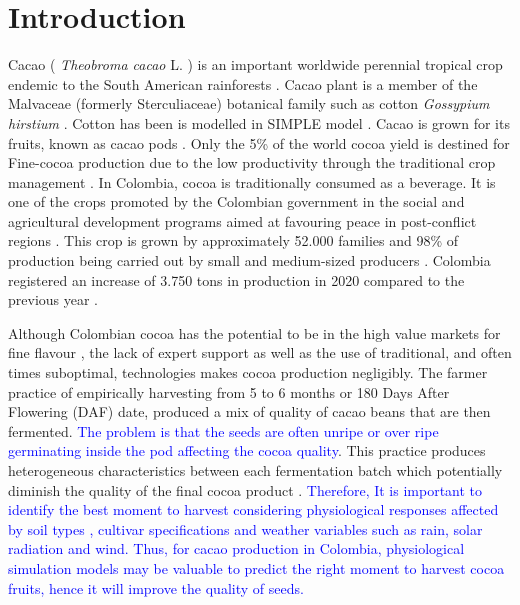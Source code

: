 \documentclass[gene,journal,article,submit,moreauthors,pdftex]{Definitions/mdpi}
\begin{document}

\section{Introduction}

Cacao ( \textit{Theobroma cacao }L. ) is an important worldwide perennial tropical crop endemic to the South American rainforests \citep{zuidema2005, motamayor2002, argout2011, Rodriguez2019}. Cacao plant is a member of the Malvaceae (formerly Sterculiaceae)  botanical family such as  cotton \textit{ Gossypium hirstium} \citep{Nix2017cotton}. Cotton has been is modelled in SIMPLE model \citep{Zao2019simple}. Cacao is grown for its fruits, known as cacao pods \citep{ Niemenak2010, suarez2021}. Only the 5\% of the world cocoa yield is destined for Fine-cocoa production due to the low productivity through  the traditional crop management \citep{argout2011}.  In Colombia, cocoa  is  traditionally  consumed  as  a  beverage. It is one of the crops promoted by the Colombian government in the social and agricultural development  programs aimed at favouring peace in post-conflict regions \citep{Rodriguez2019, Abbott2019}. This crop is grown by approximately 52.000 families \citep{Gutierrez2020} and 98\% of production being carried out by small and medium-sized producers \citep{Garcia2014, Escobar2020}. Colombia registered an increase of 3.750 tons in production in 2020 compared to the previous year \citep{lamos2020}. 

Although Colombian cocoa has the potential to be in the high value markets for fine flavour \citep{Escobar2020}, the lack of expert support as well as the use of traditional, and often times suboptimal, technologies makes cocoa production negligibly. The farmer practice of empirically harvesting from 5 to 6 months or 180 Days After Flowering  (DAF) date, produced a mix of quality of cacao beans that are then fermented. \textcolor{blue}{The problem is that  the seeds are often  unripe or  over ripe germinating inside the pod affecting the cocoa quality}. This practice produces heterogeneous characteristics between each fermentation batch which potentially diminish the quality of the final cocoa product \citep{Escobar2021}.  \textcolor{blue}{Therefore,  It is important to identify the best moment to harvest  considering physiological responses affected by  soil types , cultivar specifications and weather variables such as rain, solar radiation and wind.  Thus,  for cacao production in Colombia, physiological simulation models may be valuable to predict the right moment to harvest cocoa fruits, hence it will improve the quality of seeds.}
\end{document}
